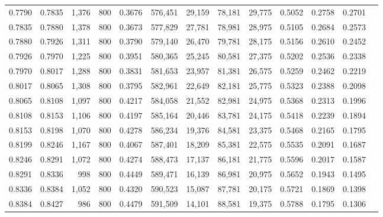 \begin{tabular}{rrrrrrrrrrrrr}
0.7790 & 0.7835 &  1,376 &   800 &                                     0.3676 & 576,451 &  29,159 &  78,181 &  29,775 & 0.5052 & 0.2758 & 0.2701 \\
0.7835 & 0.7880 &  1,378 &   800 &                                     0.3673 & 577,829 &  27,781 &  78,981 &  28,975 & 0.5105 & 0.2684 & 0.2573 \\
0.7880 & 0.7926 &  1,311 &   800 &                                     0.3790 & 579,140 &  26,470 &  79,781 &  28,175 & 0.5156 & 0.2610 & 0.2452 \\
0.7926 & 0.7970 &  1,225 &   800 &                                     0.3951 & 580,365 &  25,245 &  80,581 &  27,375 & 0.5202 & 0.2536 & 0.2338 \\
0.7970 & 0.8017 &  1,288 &   800 &                                     0.3831 & 581,653 &  23,957 &  81,381 &  26,575 & 0.5259 & 0.2462 & 0.2219 \\
0.8017 & 0.8065 &  1,308 &   800 &                                     0.3795 & 582,961 &  22,649 &  82,181 &  25,775 & 0.5323 & 0.2388 & 0.2098 \\
0.8065 & 0.8108 &  1,097 &   800 &                                     0.4217 & 584,058 &  21,552 &  82,981 &  24,975 & 0.5368 & 0.2313 & 0.1996 \\
0.8108 & 0.8153 &  1,106 &   800 &                                     0.4197 & 585,164 &  20,446 &  83,781 &  24,175 & 0.5418 & 0.2239 & 0.1894 \\
0.8153 & 0.8198 &  1,070 &   800 &                                     0.4278 & 586,234 &  19,376 &  84,581 &  23,375 & 0.5468 & 0.2165 & 0.1795 \\
0.8199 & 0.8246 &  1,167 &   800 &                                     0.4067 & 587,401 &  18,209 &  85,381 &  22,575 & 0.5535 & 0.2091 & 0.1687 \\
0.8246 & 0.8291 &  1,072 &   800 &                                     0.4274 & 588,473 &  17,137 &  86,181 &  21,775 & 0.5596 & 0.2017 & 0.1587 \\
0.8291 & 0.8336 &    998 &   800 &                                     0.4449 & 589,471 &  16,139 &  86,981 &  20,975 & 0.5652 & 0.1943 & 0.1495 \\
0.8336 & 0.8384 &  1,052 &   800 &                                     0.4320 & 590,523 &  15,087 &  87,781 &  20,175 & 0.5721 & 0.1869 & 0.1398 \\
0.8384 & 0.8427 &    986 &   800 &                                     0.4479 & 591,509 &  14,101 &  88,581 &  19,375 & 0.5788 & 0.1795 & 0.1306 \\

\end{tabular}

